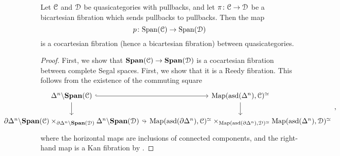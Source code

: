 \documentclass[main.tex]{subfiles}
\begin{document}
\begin{theorem}
  Let $\mathcal{C}$ and $\mathcal{D}$ be quasicategories with pullbacks, and let $\pi\colon \mathcal{C} \to \mathcal{D}$ be a bicartesian fibration which sends pullbacks to pullbacks. Then the map
  \begin{equation*}
    p\colon \mathrm{Span}(\mathcal{C}) \to \mathrm{Span}(\mathcal{D})
  \end{equation*}
  is a cocartesian fibration (hence a bicartesian fibration) between quasicategories.
\end{theorem}
\begin{proof}
  First, we show that $\mathbf{Span}(\mathcal{C}) \to \mathbf{Span}(\mathcal{D})$ is a cocartesian fibration between complete Segal spaces. First, we show that it is a Reedy fibration. This follows from the existence of the commuting square
  \begin{equation*}
    \noindent\makebox[\textwidth]{%
      \begin{tikzcd}[ampersand replacement=\&, column sep=tiny]
        \Delta^{n} \backslash \SPAN(\category{C})
        \arrow[r, hook]
        \arrow[d]
        \& \Map(\asd(\Delta^{n}), \category{C})^{\simeq} 
        \arrow[d]
        \\
        \partial \Delta^{n} \backslash \SPAN(\category{C}) \times_{\partial \Delta^{n} \backslash \SPAN(\category{D})} \Delta^{n} \backslash \SPAN(\category{D})
        \arrow[r, hook]
        \& \Map(\asd(\partial \Delta^{n}), \category{C})^{\simeq} \times_{\Map(\asd(\partial \Delta^{n}), \category{D})^{\simeq}} \Map(\asd(\Delta^{n}), \category{D})^{\simeq}
      \end{tikzcd},
    }
  \end{equation*}
  where the horizontal maps are inclusions of connected components, and the right-hand map is a Kan fibration by \cite[Prop.\ 3.1.2.3]{highertopostheory}.


\end{proof}
\end{document}
